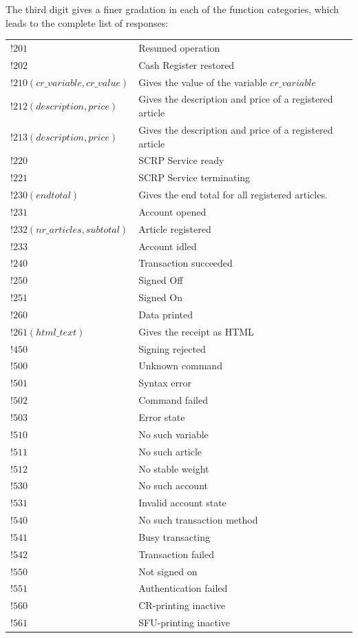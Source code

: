 The third digit gives a finer gradation in each of the function categories, which leads to the complete list of responses: \\
\begin{tabular}{ll}
$!201$ & Resumed operation\\ 
$!202$ & Cash Register restored\\ 
$!210(cr\_variable, cr\_value)$ & Gives the value of the variable $\mathit{cr\_variable}$\\ 
$!212(description,price)$ & Gives the description and price of a registered article\\ 
$!213(description,price)$ & Gives the description and price of a registered article\\ 
$!220$ & SCRP Service ready\\ 
$!221$ & SCRP Service terminating\\ 
$!230(endtotal)$ & Gives the end total for all registered articles.\\ 
$!231$ & Account opened\\ 
$!232(nr\_articles,subtotal)$ & Article registered\\ 
$!233$ & Account idled\\ 
$!240$ & Transaction succeeded\\ 
$!250$ & Signed Off\\ 
$!251$ & Signed On\\ 
$!260$ & Data printed\\ 
$!261(html\_text)$ & Gives the receipt as HTML\\ 
$!450$ & Signing rejected\\ 
$!500$ & Unknown command\\ 
$!501$ & Syntax error\\ 
$!502$ & Command failed\\ 
$!503$ & Error state \\ 
$!510$ & No such variable\\ 
$!511$ & No such article\\ 
$!512$ & No stable weight\\ 
$!530$ & No such account\\ 
$!531$ & Invalid account state\\ 
$!540$ & No such transaction method\\ 
$!541$ & Busy transacting\\ 
$!542$ & Transaction failed\\ 
$!550$ & Not signed on\\ 
$!551$ & Authentication failed\\ 
$!560$ & CR-printing inactive \\
$!561$ & SFU-printing inactive
\end{tabular}

